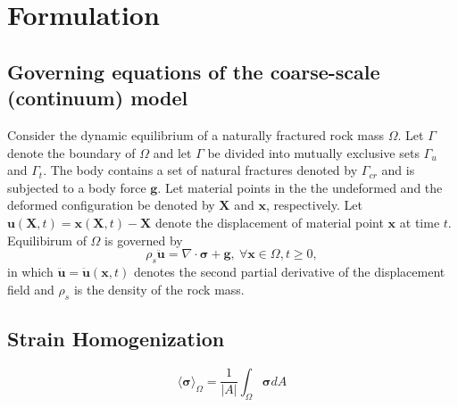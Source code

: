 \section{Formulation}

\subsection{Governing equations of the coarse-scale (continuum) model}
Consider the dynamic equilibrium of a naturally fractured rock mass $\Omega$. Let $\Gamma$ denote the boundary of $\Omega$ and let $\Gamma$ be divided into mutually exclusive sets $\Gamma_u$ and $\Gamma_t$.   The body contains a set of natural fractures denoted by $\Gamma_{cr}$ and is subjected to a body force $\mathbf{g}$.  Let material points in the the undeformed and the deformed configuration be denoted by $\mathbf{X}$ and $\mathbf{x}$, respectively. Let $\mathbf{u}\left(\mathbf{X}, t\right)=\mathbf{x}\left(\mathbf{X}, t\right)-\mathbf{X}$ denote the displacement of material point $\mathbf{x}$ at time $t$.    Equilibirum of $\Omega$ is governed by
\begin{equation}
\label{eqn:equil}
\rho_s \ddot{\mathbf{u}} =\nabla \cdot \boldsymbol{\sigma} +\mathbf{g},\:\forall \mathbf{x}\in\Omega, t\geq0,
\end{equation}
in which $\ddot{\mathbf{u}}=\ddot{\mathbf{u}}\left(\mathbf{x}, t\right)$ denotes the second partial derivative of the displacement field and $\rho_s$ is the density of the rock mass. 




\subsection{Strain Homogenization}

\begin{equation}
\label{eqn:stressav}
\langle \boldsymbol{\sigma} \rangle_\Omega = \frac{1}{|A|} \int_\Omega \boldsymbol{\sigma} dA
\end{equation}

\begin{equation}
\label{eqn:stresssplit}
\end{equation}



